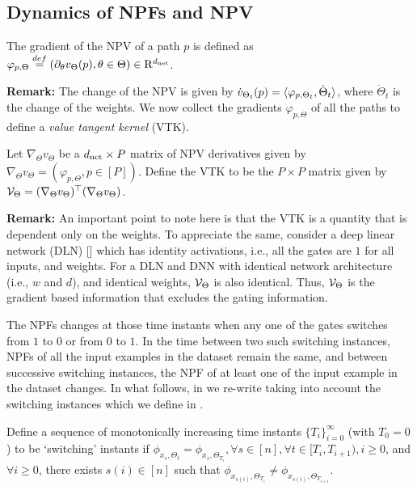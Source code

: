 \documentclass{article}
\begin{document}
\subsection{Dynamics of NPFs and NPV}
\begin{definition}\label{def:npvgrad}
The gradient of the NPV of a path $p$ is defined as $\varphi_{p,\Theta}\stackrel{def}=(\partial_{\theta}v_{\Theta}(p), \theta \in\Theta)\in\mathrm{R}^{d_{\text{net}}}$.
\end{definition}
\textbf{Remark:} The change of the NPV is given by $\dot{v}_{\Theta_t}(p)=\langle \varphi_{p,\Theta_t},\dot{\Theta}_t\rangle$, where $\dot{\Theta}_t$ is the change of the weights. We now collect the gradients $\varphi_{p,\Theta}$ of all the paths to define a \emph{value tangent kernel} (VTK). 
\begin{definition}
Let $\nabla_{\Theta}v_{\Theta}$ be a $d_{\text{net}}\times P$ matrix of NPV derivatives given by $\nabla_{\Theta}v_{\Theta}=(\varphi_{p,\Theta},p\in[P])$. Define the VTK to be the $P\times P$ matrix given by $\mathcal{V}_{\Theta}=(\nabla_{\Theta}v_{\Theta})^\top(\nabla_{\Theta}v_{\Theta})$.
\end{definition}
\textbf{Remark:} An important point to note here is that the VTK is a quantity that is dependent only on the weights. To appreciate the same, consider a deep linear network (DLN) [] which has identity activations, i.e., all the gates are $1$ for all inputs, and weights. For a DLN and DNN with identical network architecture (i.e., $w$ and $d$), and identical weights, $\mathcal{V}_{\Theta}$ is also identical. Thus, $\mathcal{V}_{\Theta}$ is the gradient based information that excludes the gating information.

The NPFs changes at those time instants when any one of the gates switches from $1$ to $0$ or from $0$ to $1$. In the time between two such switching instances, NPFs of all the input examples in the dataset remain the same, and between successive switching instances,  the NPF of at least one of the input example in the dataset changes. In what follows, in  we re-write  taking into account the switching instances which we define in .
\begin{definition}\label{def:switch}
Define a sequence of monotonically increasing time instants $\{T_{i}\}_{i=0}^\infty$ (with $T_0=0$) to be `switching' instants if $\phi_{x_s,\Theta_t}=\phi_{x_s,\Theta_{T_i}},\forall s\in[n],\forall t\in[T_{i},T_{i+1}), i\geq 0$, and  $\forall i\geq 0$, there exists $s(i)\in[n]$ such that $\phi_{x_{s(i)},\Theta_{T_i}}\neq \phi_{x_{s(i)},\Theta_{T_{i+1}}}$.
\end{definition}
\end{document}
